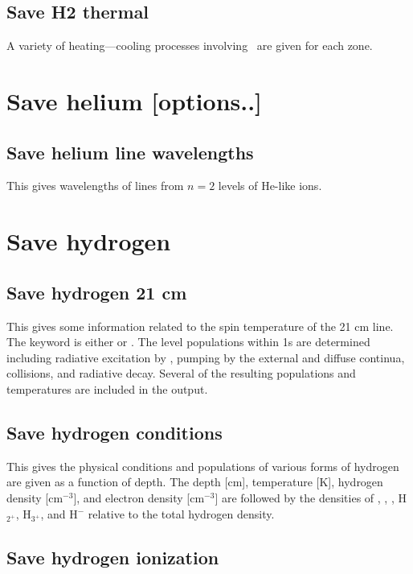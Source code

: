 \subsection{Save H2 thermal}

A variety of heating---cooling processes involving \htwo\ are given
for each zone.

\section{Save helium [options..]}

\subsection{Save helium line wavelengths}

This gives wavelengths of lines from $n=2$ levels of He-like ions.

\section{Save hydrogen}

\subsection{Save hydrogen 21 cm}

This gives some information related to the spin temperature of the 21
cm line.
The keyword is either \cdCommand{21 cm} or \cdCommand{21cm}.
The level populations
within 1s are determined including radiative excitation by \la, pumping by
the external and diffuse continua, collisions, and radiative decay.  Several
of the resulting populations and temperatures are included in the output.

\subsection{Save hydrogen conditions}

This gives the physical conditions and populations of various forms of
hydrogen are given as a function of depth.  The depth [cm], temperature
[K], hydrogen density [cm$^{-3}$], and electron density [cm$^{-3}$] are followed by
the densities of \hO, \hplus, \htwo, H$_{2^{+}}$, H$_{3^{+}}$, and H$^-$ relative to the total hydrogen
density.

\subsection{Save hydrogen ionization}

